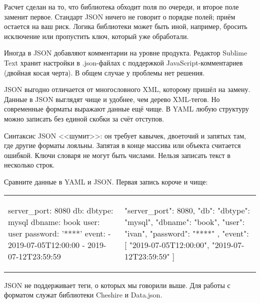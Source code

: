 Расчет сделан на то, что библиотека обходит поля по очереди, и второе поле
заменит первое. Стандарт JSON ничего не говорит о порядке полей; при\"{е}м остается
на ваш риск. Логика библиотеки может быть иной, например, бросить исключение или
пропустить ключ, который уже обработали.

Иногда в JSON добавляют комментарии на уровне продукта. Редактор Sublime Text
хранит настройки в .json-файлах с поддержкой JavaScript-комментариев (двойная
косая черта). В общем случае у проблемы нет решения.

JSON выгодно отличается от многословного XML, которому приш\"{е}л на замену. Данные
в JSON выглядят чище и удобнее, чем дерево XML-тегов. Но современные форматы
выражают данные ещ\"{е} чище. В YAML любую структуру можно записать без единой
скобки за сч\"{е}т отступов.

Синтаксис JSON <<шумит>>: он требует кавычек, двоеточий и запятых там, где
другие форматы лояльны. Запятая в конце массива или объекта считается
ошибкой. Ключи словаря не могут быть числами. Нельзя записать текст в несколько
строк.

Сравните данные в YAML и JSON. Первая запись короче и чище:

\noindent
\begin{tabular}{ @{}p{5cm} @{}p{5cm} }

\vspace{1.25em}

\begin{english}
  \begin{yaml}
server_port: 8080
db:
  dbtype:   mysql
  dbname:   book
  user:     user
  password: '****'
event:
  - 2019-07-05T12:00:00
  - 2019-07-12T23:59:59
  \end{yaml}
\end{english}

&

\begin{english}
  \begin{json}
{
    "server_port": 8080,
    "db": {
        "dbtype":   "mysql",
        "dbname":   "book",
        "user":     "ivan",
        "password": "****"
    },
    "event": [
        "2019-07-05T12:00:00",
        "2019-07-12T23:59:59"
    ]
}
  \end{json}
\end{english}

\end{tabular}


JSON не поддерживает теги, о которых мы говорили выше. Для работы с форматом
служат библиотеки Cheshire и
Data.json.

